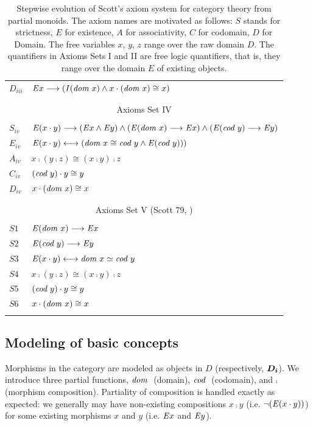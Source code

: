 \begin{table}[htp]
\begin{tabular}{ll}
 $D_{iii}$ & $\mathit{E} x \longrightarrow (\textit{I\/}(\textit{dom \/} x) \wedge x \cdot (\textit{dom \/} x) \cong x)$ \\
\\
\hline
\\
\multicolumn{2}{c}{Axioms Set IV} \\
\\
$S_{iv}$ & $\mathit{E}(x \cdot y) \longrightarrow (\mathit{E} x \wedge \mathit{E} y) \wedge (\mathit{E} (\textit{dom \/} x) \longrightarrow \mathit{E}
        x) \wedge (\mathit{E} (\textit{cod \/} y) \longrightarrow \mathit{E}
        y)$ \\
 $E_{iv}$ & $\mathit{E}(x \cdot y) \longleftrightarrow (\textit{dom \/} x \cong \textit{cod \/} y \wedge \mathit{E} (\textit{cod \/} y)))$ \\
 $A_{iv}$ & $x\comp (y \comp z) \cong (x \comp y) \comp z$ \\
 $C_{iv}$ & $(\textit{cod \/} y) \cdot y \cong y$ \\
 $D_{iv}$ & $x \cdot (\textit{dom \/} x) \cong x$  \\
\\
\hline
\\
\multicolumn{2}{c}{Axioms Set V (Scott 79, \cite{Scott79})} \\
\\
$S1$ & $\mathit{E} (\textit{dom \/} x) \longrightarrow \mathit{E} x$ \\
$S2$ & $\mathit{E} (\textit{cod \/} y) \longrightarrow \mathit{E} y$ \\
$S3$ & $\mathit{E}(x \cdot y) \longleftrightarrow \textit{dom \/} x \simeq \textit{cod \/} y$ \\
$S4$ & $x\comp (y \comp z) \cong (x \comp y) \comp z$ \\
$S5$ & $(\textit{cod \/} y) \cdot y \cong y$ \\
$S6$ & $x \cdot (\textit{dom \/} x) \cong x$  \\
\\
\hline
\end{tabular}
\caption{Stepwise evolution of Scott's \cite{Scott79} axiom
  system for category theory from partial monoids. The axiom names are
  motivated as follows: 
  $S$ stands for strictness, $E$ for existence, $A$ for associativity, $C$ for
  codomain, $D$ for Domain. The free variables $x$, $y$, $z$ range over
  the raw domain $D$. The quantifiers in Axioms Sets I and II are
  free logic quantifiers, that is, they range over the domain $E$ of
  existing objects. \label{axioms-sets-1}}
\end{table}





\subsection{Modeling of basic concepts}
Morphisms in the category are modeled as objects in $D$ (respectively,
$\boldsymbol{D_i}$). We introduce three partial functions, 
$\textit{dom \/}$ (domain), $\textit{cod \/}$ (codomain), and $\comp$ (morphism composition). 
Partiality of composition is handled exactly as expected: we generally may have 
non-existing compositions $x\comp y$ (i.e. $\neg(\mathit{E}(x\cdot y))$) for some existing  
morphisms $x$ and $y$ (i.e. $\mathit{E} x$ and $\mathit{E} y$).


